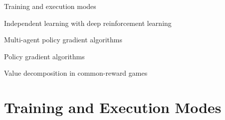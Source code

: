 

\otherslide

\subtitle{Multi-Agent Deep Reinforcement Learning -- Part 1}


\maketitle

\introslide

\begin{frame}{\outline}

\blist
    \item Training and execution modes
    \item Independent learning with deep reinforcement learning
    \item Multi-agent policy gradient algorithms
    \item Policy gradient algorithms
    \item Value decomposition in common-reward games
\elist
\end{frame}

\section{Training and Execution Modes}

